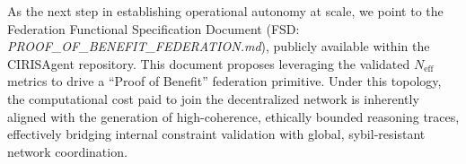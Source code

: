 \documentclass[11pt,a4paper]{article}
\begin{document}
As the next step in establishing operational autonomy at scale, we point to the Federation Functional Specification Document (FSD: \textit{PROOF\_OF\_BENEFIT\_FEDERATION.md}), publicly available within the CIRISAgent repository. This document proposes leveraging the validated $N_{\text{eff}}$ metrics to drive a ``Proof of Benefit'' federation primitive. Under this topology, the computational cost paid to join the decentralized network is inherently aligned with the generation of high-coherence, ethically bounded reasoning traces, effectively bridging internal constraint validation with global, sybil-resistant network coordination.
\end{document}
